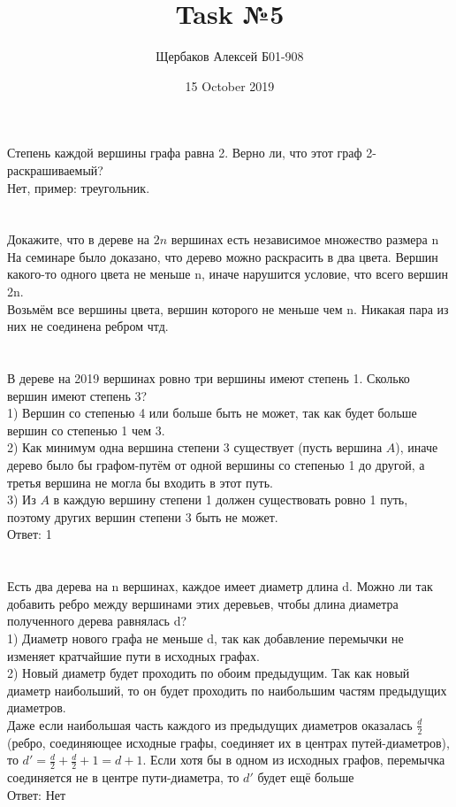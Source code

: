 \documentclass{article}
\title{Task №5}
\author{Щербаков Алексей Б01-908}
\date{15 October 2019}
\begin{document}
\maketitle
\section{}
Степень каждой вершины графа равна 2. Верно ли, что этот граф 2-раскрашиваемый?\\Нет, пример: треугольник.
\section{}
Докажите, что в дереве на $2n$ вершинах есть независимое множество размера n\\
На семинаре было доказано, что дерево можно раскрасить в два цвета. Вершин какого-то одного цвета не меньше n, иначе нарушится условие, что всего вершин 2n.\\Возьмём все вершины цвета, вершин которого не меньше чем n. Никакая пара из них не соединена ребром чтд.
\section{}
В дереве на 2019 вершинах ровно три вершины имеют степень 1. Сколько вершин имеют степень 3?
\\
1) Вершин со степенью 4 или больше быть не может, так как будет больше вершин со степенью 1 чем 3.\\
2) Как минимум одна вершина степени 3 существует (пусть вершина $A$), иначе дерево было бы графом-путём от одной вершины со степенью 1 до другой, а третья вершина не могла бы входить в этот путь.\\
3) Из $A$ в каждую вершину степени 1 должен существовать ровно 1 путь, поэтому других вершин степени 3 быть не может.\\
Ответ: 1
\section{}
Есть два дерева на n вершинах, каждое имеет диаметр длина d. Можно ли так добавить ребро между вершинами этих деревьев, чтобы длина диаметра полученного дерева равнялась d?\\
1) Диаметр нового графа не меньше d, так как добавление перемычки не изменяет кратчайшие пути в исходных графах.\\
2) Новый диаметр будет проходить по обоим предыдущим. Так как новый диаметр наибольший, то он будет проходить по наибольшим частям предыдущих диаметров.\\
Даже если наибольшая часть каждого из предыдущих диаметров оказалась $\frac{d}{2}$ (ребро, соединяющее исходные графы, соединяет их в центрах путей-диаметров), то $d'=\frac{d}{2} + \frac{d}{2} + 1 = d + 1$. Если хотя бы в одном из исходных графов, перемычка соединяется не в центре пути-диаметра, то $d'$ будет ещё больше\\
Ответ: Нет
\end{document}
